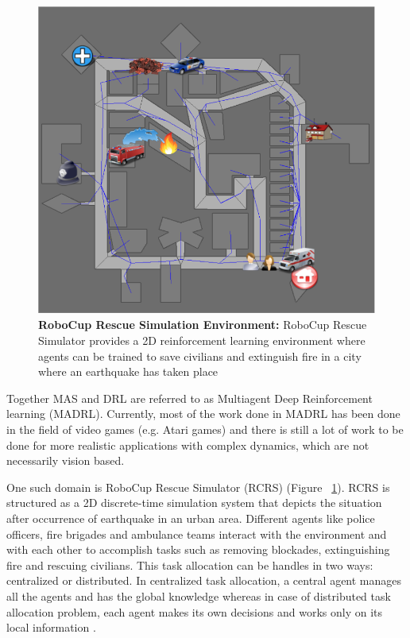 \documentclass[12pt]{report}
\begin{document}
\begin{figure}[!h]
    \centering
    \includegraphics[width=12cm]{10.png}
    \caption{\textbf{RoboCup Rescue Simulation Environment:} RoboCup Rescue Simulator provides a 2D reinforcement learning environment where agents can be trained to save civilians and extinguish fire in a city where an earthquake has taken place}
    \label{fig:10}
\end{figure}

Together MAS and DRL are referred to as Multiagent Deep Reinforcement learning (MADRL). Currently, most of the work done in MADRL has been done in the field of video games (e.g. Atari games) and there is still a lot of work to be done for more realistic applications with complex dynamics, which are not necessarily vision based. 

One such domain is RoboCup Rescue Simulator (RCRS) (Figure ~\ref{fig:10}). RCRS is structured as a 2D discrete-time simulation system that depicts the situation after occurrence of earthquake in an urban area. Different agents like police officers, fire brigades and ambulance teams interact with the environment and with each other to accomplish tasks such as removing blockades, extinguishing fire and rescuing civilians. This task allocation can be handles in two ways: centralized or distributed. In centralized task allocation, a central agent manages all the agents and has the global knowledge whereas in case of distributed task allocation problem, each agent makes its own decisions and works only on its local information \cite{Nair}. 
\end{document}
